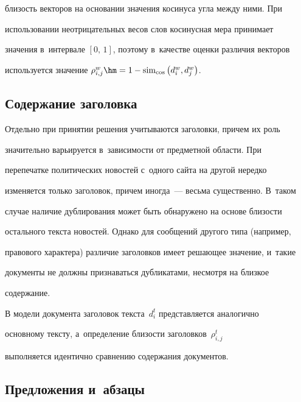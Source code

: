 близость векторов на основании значения косинуса угла между ними. При

использовании неотрицательных весов слов косинусная мера принимает

значения в~интервале $[0,\,1]$, поэтому в~качестве оценки различия векторов

используется значение $\rho_{i,j}^w\hm= 1-\mathrm{sim}_{\cos}\left( d_i^w, d_j^w\right)$.



\vspace*{-4pt}



\subsection{Содержание заголовка}



\vspace*{-2pt}



  Отдельно при принятии решения учитываются заголовки, причем их роль

значительно варьируется в~зависимости от предметной области. При

перепечатке политических новостей с~одного сайта на другой нередко

изменяется только заголовок, причем иногда~--- весьма существенно. В~таком

случае наличие дублирования может быть обнаружено на основе близости

остального текста новостей. Однако для сообщений другого типа (например,

правового характера) различие заголовков имеет решающее значение, и~такие

документы не должны признаваться дубликатами, несмотря на близкое

содержание.



  В модели документа заголовок текста~$d_i^t$ представляется аналогично

основному тексту, а~определение близости заголовков~$\rho_{i,j}^t$

выполняется идентично сравнению содержания документов.



\vspace*{-4pt}



\subsection{Предложения и~абзацы}



